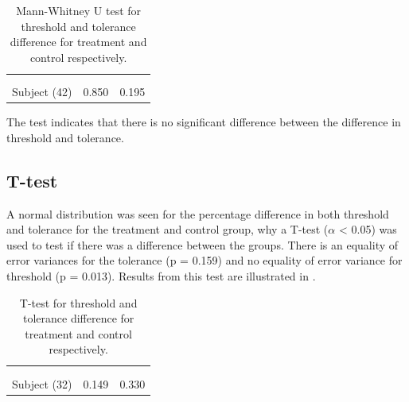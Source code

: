 \begin{longtable} {l|c|c}
	\caption{Mann-Whitney U test for threshold and tolerance difference for treatment and control respectively.}	\label{tab:MannWhitney1} \\ 
 \cellcolor[HTML]{C0C0C0} {} & 
 \multicolumn{1}{c|}{ \cellcolor[HTML]{C0C0C0}{\textbf{Threshold}}} & \multicolumn{1}{c}{ \cellcolor[HTML]{C0C0C0}{\textbf{Tolerance}}}  	\\  \rule{0pt}{3ex} 
  \cellcolor[HTML]{C0C0C0}{} &
 \multicolumn{1}{c|}{ \cellcolor[HTML]{C0C0C0}{Difference }} & \multicolumn{1}{|c}{ \cellcolor[HTML]{C0C0C0}{Difference}}  	\\ \hline
Subject (42) & 0.850 & 0.195 \\ \hline
\end{longtable}
\vspace{-.5cm}

The test indicates that there is no significant difference between the difference in threshold and tolerance.

\subsection{T-test}
A normal distribution was seen for the percentage difference in both threshold and tolerance for the treatment and control group, why a T-test ($\alpha$ < 0.05) was used to test if there was a difference between the groups. 
There is an equality of error variances for the tolerance (p = 0.159) and no equality of error variance for threshold (p = 0.013).
Results from this test are illustrated in .

\begin{longtable} {l|c|c}
	\caption{T-test for threshold and tolerance difference for treatment and control respectively.}	\label{tab:T-test1} \\
	 \cellcolor[HTML]{C0C0C0} {} & 
 \multicolumn{1}{c|}{ \cellcolor[HTML]{C0C0C0}{\textbf{Threshold}}} & \multicolumn{1}{c}{ \cellcolor[HTML]{C0C0C0}{\textbf{Tolerance}}}  	\\  \rule{0pt}{3ex} 
  \cellcolor[HTML]{C0C0C0}{} &
 \multicolumn{1}{c|}{ \cellcolor[HTML]{C0C0C0}{Difference }} & \multicolumn{1}{|c}{ \cellcolor[HTML]{C0C0C0}{Difference}}  	\\ \hline
Subject (32) & 0.149 & 0.330  \\ \hline

\end{longtable}
\vspace{-.5cm}

